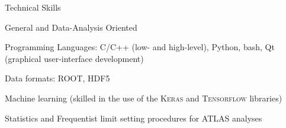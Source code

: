 \begin{minipage}{0.8\textwidth}
\begin{minipage}{0.8\textwidth}
		




\vspace{0.35in}
{\Large Technical Skills} \\
\HRule
\vspace{0.15in}

\hspace{0.2in}
General and Data-Analysis Oriented
\vspace{0.1in}

\hspace{0.2in}
\begin{minipage}{0.8\textwidth}

    \vspace{0.1in}
    \hspace{0.15in}
    \begin{minipage}{\textwidth}
    Programming Languages: C/C++ (low- and high-level), Python, bash, Qt (graphical user-interface development)
    \end{minipage}


    \vspace{0.1in}
    \hspace{0.15in}
    \begin{minipage}{\textwidth}
    Data formats: ROOT, HDF5
    \end{minipage}

    \vspace{0.1in}
	\hspace{0.15in}
	\begin{minipage}{\textwidth}
	Machine learning (skilled in the use of the \textsc{Keras} and \textsc{Tensorflow} libraries)
    \end{minipage}

	\vspace{0.1in}
	\hspace{0.15in}
    \begin{minipage}{\textwidth}
	Statistics and Frequentist limit setting procedures for ATLAS analyses
    \end{minipage}


\end{minipage}
\end{minipage}
\end{minipage}

